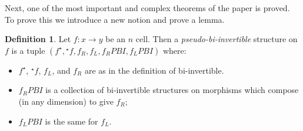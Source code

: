 \documentclass[draft]{article}
\theoremstyle{definition} \newtheorem{definition}{Definition}
\theoremstyle{remark} \newtheorem{remark}{Remark}
\newcommand{\linv}[1]{{}^\star\!#1} \newcommand{\rinv}[1]{#1^\star}
\begin{document}
\noindent Next, one of the most important and complex theorems of the
paper is proved. To prove this we introduce a new notion and prove a
lemma.

\begin{definition}
  Let \(f : x \to y\) be an \(n\) cell. Then a
  \emph{pseudo-bi-invertible} structure on \(f\) is a tuple \((\rinv
  f, \linv f, f_R, f_L, f_R{}PBI, f_L{}PBI)\) where:
  \begin{itemize}
  \item \(\rinv f\), \(\linv f\), \(f_L\), and \(f_R\) are as in the
    definition of bi-invertible.
  \item \(f_R{}PBI\) is a collection of bi-invertible structures on
    morphisms which compose (in any dimension) to give \(f_R\);
  \item \(f_L{}PBI\) is the same for \(f_L\).
  \end{itemize}
\end{definition}
\end{document}
